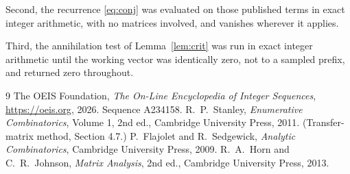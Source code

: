 \documentclass[11pt,a4paper]{article}
\theoremstyle{plain}
\theoremstyle{definition}
\begin{document}
Second, the recurrence \eqref{eq:conj} was evaluated on those published terms in exact
integer arithmetic, with no matrices involved, and vanishes wherever it applies.

Third, the annihilation test of Lemma~\ref{lem:crit} was run in exact integer arithmetic
until the working vector was identically zero, not to a sampled prefix, and returned zero
throughout.

\begin{thebibliography}{9}
 The OEIS Foundation, \emph{The On-Line Encyclopedia of Integer
Sequences}, \url{https://oeis.org}, 2026. Sequence A234158.
 R.~P.~Stanley, \emph{Enumerative Combinatorics}, Volume 1, 2nd ed.,
Cambridge University Press, 2011. (Transfer-matrix method, Section 4.7.)
 P.~Flajolet and R.~Sedgewick, \emph{Analytic Combinatorics}, Cambridge
University Press, 2009.
 R.~A.~Horn and C.~R.~Johnson, \emph{Matrix Analysis}, 2nd ed., Cambridge
University Press, 2013.
\end{thebibliography}
\end{document}

